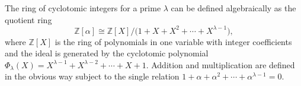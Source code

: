The ring of cyclotomic integers for a prime $\lambda$ can be defined algebraically as the quotient ring
$$\mathbb{Z}[\alpha] \cong \mathbb{Z}[X] \big/ \bigl(1 + X + X^2 + \cdots + X^{\lambda-1}\bigr),$$
where $\mathbb{Z}[X]$ is the ring of polynomials in one variable with integer coefficients and the ideal is generated by the cyclotomic polynomial $\Phi_\lambda(X) = X^{\lambda-1} + X^{\lambda-2} + \cdots + X + 1$. Addition and multiplication are defined in the obvious way subject to the single relation $1 + \alpha + \alpha^2 + \cdots + \alpha^{\lambda-1} = 0$.
